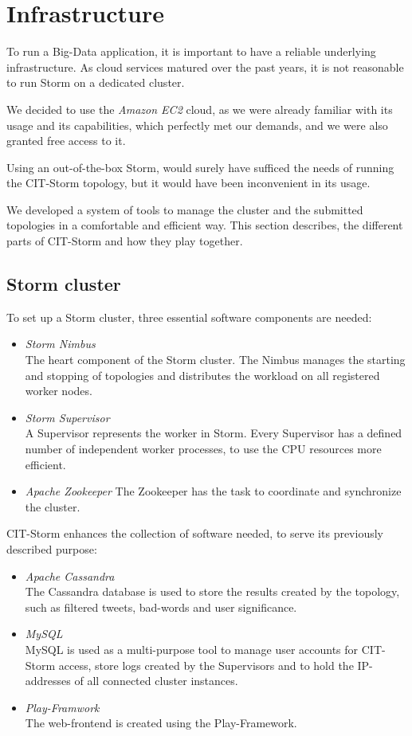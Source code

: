 \section{Infrastructure}
\label{sect:Infrastructure}
To run a Big-Data application, it is important to have a reliable underlying infrastructure. As cloud services matured over the past years, it is not reasonable to run Storm on a dedicated cluster.

We decided to use the \textsl{Amazon EC2} cloud, as we were already familiar with its usage and its capabilities, which perfectly met our demands, and we were also granted free access to it.

Using an out-of-the-box Storm, would surely have sufficed the needs of running the CIT-Storm topology, but it would have been inconvenient in its usage.

We developed a system of tools to manage the cluster and the submitted topologies in a comfortable and efficient way. This section describes, the different parts of CIT-Storm and how they play together.

\subsection{Storm cluster}
To set up a Storm cluster, three essential software components are needed:
\begin{itemize}
\item \textsl{Storm Nimbus}\\
The heart component of the Storm cluster. The Nimbus manages the starting and stopping of topologies and distributes the workload on all registered worker nodes.
\item \textsl{Storm Supervisor}\\
A Supervisor represents the worker in Storm. Every Supervisor has a defined number of independent worker processes, to use the CPU resources more efficient.
\item \textsl{Apache Zookeeper}
The Zookeeper has the task to coordinate and synchronize the cluster.
\end{itemize}

CIT-Storm enhances the collection of software needed, to serve its previously described purpose:

\begin{itemize}
\item \textsl{Apache Cassandra}\\
The Cassandra database is used to store the results created by the topology, such as filtered tweets, bad-words and user significance.
\item \textsl{MySQL}\\
MySQL is used as a multi-purpose tool to manage user accounts for CIT-Storm access, store logs created by the Supervisors and to hold the IP-addresses of all connected cluster instances.
\item \textsl{Play-Framwork}\\
The web-frontend is created using the Play-Framework.
\end{itemize}

